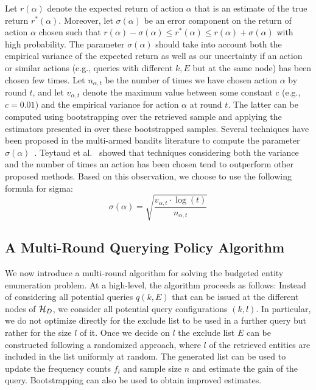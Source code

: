 Let $r(\alpha)$ denote the expected return of action $\alpha$ that is an estimate of the true return $r^*(\alpha)$. Moreover, let $\sigma(\alpha)$ be an error component on the return of action $\alpha$ chosen such that $r(\alpha) - \sigma(\alpha) \leq r^*(\alpha) \leq r(\alpha) + \sigma(\alpha)$ with high probability. The parameter $\sigma(\alpha)$ should take into account both the empirical variance of the expected return as well as our uncertainty if an action or similar actions (e.g., queries with different $k, E$ but at the same node) has been chosen few times. Let $n_{\alpha,t}$ be the number of times we have chosen action $\alpha$ by round $t$, and let $v_{\alpha,t}$ denote the maximum value between some constant $c$ (e.g., $c = 0.01$) and the empirical variance for action $\alpha$ at round $t$. The latter can be computed using bootstrapping over the retrieved sample and applying the estimators presented in  over these bootstrapped samples. Several techniques have been proposed in the multi-armed bandits literature to compute the parameter $\sigma(\alpha)$~\cite{teytaud:inria-00173263}. Teytaud et al.~\cite{teytaud:inria-00173263} showed that techniques considering both the variance and the number of times an action has been chosen tend to outperform other proposed methods. \iftr Based on this observation, we choose to use the following formula for sigma:
\begin{equation}
\label{eq:upper}
\sigma(\alpha) = \sqrt{\frac{v_{\alpha,t}\cdot\log(t)}{n_{\alpha,t}}}
\end{equation}
\fi

\subsection{A Multi-Round Querying Policy Algorithm}
\label{sec:heuristic}
We now introduce a multi-round algorithm for solving the budgeted entity enumeration problem. At a high-level, the algorithm proceeds as follows: Instead of considering all potential queries $q(k,E)$ that can be issued at the different nodes of $\mathcal{H}_D$, we consider all potential query configurations $(k,l)$. In particular, we do not optimize directly for the exclude list to be used in a further query but rather for the size $l$ of it. Once we decide on $l$ the exclude list $E$ can be constructed following a randomized approach, where $l$ of the retrieved entities are included in the list uniformly at random. The generated list can be used to update the frequency counts $f_i$ and sample size $n$ and estimate the gain of the query. Bootstrapping can also be used to obtain improved estimates. 

